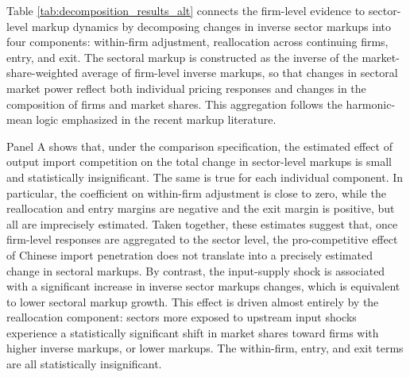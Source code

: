 \documentclass[12pt]{article}
\begin{document}
Table \ref{tab:decomposition_results_alt} connects the firm-level evidence to sector-level markup dynamics by decomposing changes in inverse sector markups into four components: within-firm adjustment, reallocation across continuing firms, entry, and exit. The sectoral markup is constructed as the inverse of the market-share-weighted average of firm-level inverse markups, so that changes in sectoral market power reflect both individual pricing responses and changes in the composition of firms and market shares. This aggregation follows the harmonic-mean logic emphasized in the recent markup literature.

Panel A shows that, under the comparison specification, the estimated effect of output import competition on the total change in sector-level markups is small and statistically insignificant. The same is true for each individual component. In particular, the coefficient on within-firm adjustment is close to zero, while the reallocation and entry margins are negative and the exit margin is positive, but all are imprecisely estimated. Taken together, these estimates suggest that, once firm-level responses are aggregated to the sector level, the pro-competitive effect of Chinese import penetration does not translate into a precisely estimated change in sectoral markups. By contrast, the input-supply shock is associated with a significant increase in inverse sector markups changes, which is equivalent to lower sectoral markup growth. This effect is driven almost entirely by the reallocation component: sectors more exposed to upstream input shocks experience a statistically significant shift in market shares toward firms with higher inverse markups, or lower markups. The within-firm, entry, and exit terms are all statistically insignificant.
\end{document}
